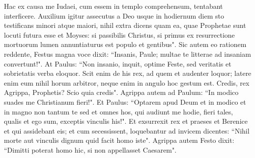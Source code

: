 \begin{biblechapter}
\verse Hac ex causa me Iudaei, cum essem in templo comprehensum, tentabant interficere. 
\verse Auxilium igitur assecutus a Deo usque in hodiernum diem sto testificans minori atque maiori, nihil extra dicens quam ea, quae Prophetae sunt locuti futura esse et Moyses: 
\verse si passibilis Christus, si primus ex resurrectione mortuorum lumen annuntiaturus est populo et gentibus". 
\verse Sic autem eo rationem reddente, Festus magna voce dixit: “Insanis, Paule; multae te litterae ad insaniam convertunt!". 
\verse At Paulus: “Non insanio, inquit, optime Feste, sed veritatis et sobrietatis verba eloquor. 
\verse Scit enim de his rex, ad quem et audenter loquor; latere enim eum nihil horum arbitror, neque enim in angulo hoc gestum est. 
\verse Credis, rex Agrippa, Prophetis? Scio quia credis". 
\verse Agrippa autem ad Paulum: “In modico suades me Christianum fieri!". 
\verse Et Paulus: “Optarem apud Deum et in modico et in magno non tantum te sed et omnes hos, qui audiunt me hodie, fieri tales, qualis et ego sum, exceptis vinculis his!". 
\verse Et exsurrexit rex et praeses et Berenice et qui assidebant eis; 
\verse et cum secessissent, loquebantur ad invicem dicentes: “Nihil morte aut vinculis dignum quid facit homo iste". 
\verse Agrippa autem Festo dixit: “Dimitti poterat homo hic, si non appellasset Caesarem". 
\end{biblechapter}

